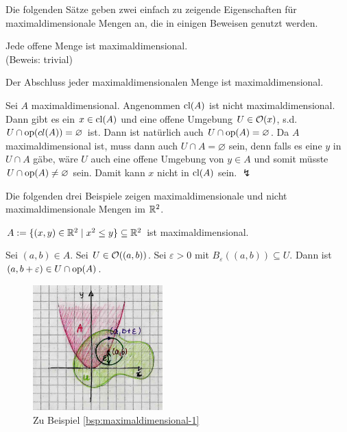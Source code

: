     
    Die folgenden Sätze geben zwei einfach zu zeigende Eigenschaften für maximaldimensionale Mengen an, die in einigen Beweisen genutzt werden.
    \begin{satz}\label{satz:offen-maxdim}
        Jede offene Menge ist maximaldimensional.\\
        (Beweis: trivial)
    \end{satz}
    
    
    \begin{satz}\label{satz:abschluss-maxdim}
        Der Abschluss jeder maximaldimensionalen Menge ist maximaldimensional.
    \end{satz}
    
    \begin{bew}
        Sei $A$ maximaldimensional. 
        Angenommen $\text{cl}(A)$ ist nicht maximaldimensional.
        Dann gibt es ein $x \in \text{cl}(A)$ und eine offene Umgebung $U \in \mathcal{O}(x)$, s.d. $U \cap \text{op}(cl(A)) = \varnothing$ ist.
        Dann ist natürlich auch $U \cap \text{op}(A) = \varnothing$.
        Da $A$ maximaldimensional ist, muss dann auch $U \cap A = \varnothing$ sein, denn falls es eine $y$ in $U \cap A$ gäbe, wäre $U$ auch eine offene Umgebung von $y \in A$ und somit müsste $U \cap \text{op}(A) \neq \varnothing$ sein.
        Damit kann $x$ nicht in $\text{cl}(A)$ sein. 
        $\lightning$
    \end{bew}


    Die folgenden drei Beispiele zeigen maximaldimensionale und nicht maximaldimensionale Mengen im $\mathbb{R}^2$.
    \begin{bsp}\label{bsp:maximaldimensional-1}
        $A := \{(x,y) \in \mathbb{R}^2 \mid x^2 \leq y\} \subseteq \mathbb{R}^2$ ist maximaldimensional.
    \end{bsp}
    \begin{bew}
        Sei $(a,b) \in A$. Sei $U \in \mathcal{O}((a,b))$. Sei $\varepsilon > 0$ mit $B_\varepsilon((a,b)) \subseteq U$. Dann ist $(a,b+\varepsilon) \in U \cap \text{op}(A)$.
    \end{bew}

    
    \begin{figure}[ht]
        \centering
        \includegraphics[width=5cm]{gfx/maxdim-1.png}
        \caption{Zu Beispiel \ref{bsp:maximaldimensional-1}}
        \label{fig:maxdim-1}
    \end{figure}

